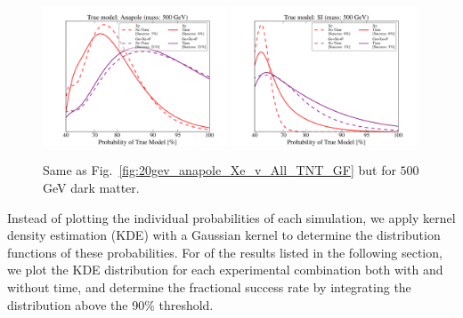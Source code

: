 \documentclass[11pt]{article}
\begin{document}
\begin{figure}
\centering
\includegraphics[width=0.49\textwidth, trim=1.cm 0.0cm 1.cm 0.4cm,clip=true]{plots/PDF_Single_500GeV_Anapole_50sims_Xe_vs_FGeXe_GF_TNT.pdf}
\includegraphics[width=0.49\textwidth, trim=1.cm 0.0cm 1.cm 0.4cm,clip=true]{plots/PDF_Single_500GeV_SI_Higgs_50sims_Xe_vs_FGeXe_GF_TNT.pdf}
\caption{\label{fig:500gev_anapole_Xe_v_All_TNT_GF}
Same as Fig.~\ref{fig:20gev_anapole_Xe_v_All_TNT_GF} but for $500$ GeV dark matter.}
\end{figure}


Instead of plotting the individual probabilities of each simulation, we apply kernel density estimation (KDE) with a Gaussian kernel to determine the distribution functions of these probabilities. For of the results listed in the following section, we plot the KDE distribution for each experimental combination both with and without time, and determine the fractional success rate by integrating the distribution above the 90\% threshold. 
\end{document}
